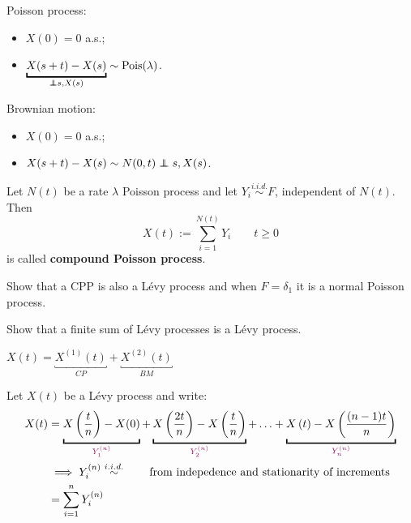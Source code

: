 \documentclass{article}
\begin{document}
	\begin{example}
		Poisson process:
		\begin{itemize}
			\item $X(0)=0$ a.s.;
			\item $\underbracket{X(s+t)-X(s)}_{\mathclap{\independent s,X(s)}}\sim\text{Pois}(\lambda)$.
		\end{itemize}
		Brownian motion:
		\begin{itemize}
		\item $X(0)=0$ a.s.;
		\item $X(s+t)-X(s)\sim N(0,t)\independent s,X(s)$.
		\end{itemize}
	\end{example}
	\begin{definition}
		Let $N(t)$ be a rate $\lambda$ Poisson process and let $Y_i\stackrel{i.i.d.}{\sim}F$, independent of $N(t)$. Then
		\[X(t):=\sum_{i=1}^{N(t)}Y_i\qquad t\geqslant 0\] 
		is called \textbf{compound Poisson process}.
	\end{definition}
	\begin{exercise}
		Show that a CPP is also a L\'evy process and when $F=\delta_1$ it is a normal Poisson process.
	\end{exercise}
	\begin{figure}[H]
		\centering
		
	\end{figure}
	\begin{exercise}
		Show that a finite sum of L\'evy processes is a L\'evy process.
	\end{exercise}
	\begin{example}
		$X(t)=\underbracket{X^{(1)}(t)}_{CP}+\underbracket{X^{(2)}(t)}_{BM}$
		\begin{figure}[H]
			\centering
			
		\end{figure}
		\begin{figure}[H]
			\centering
			
		\end{figure}
	\end{example}
	Let $X(t)$ be a L\'evy process and write:
	\begin{align*}
		X(t)&=\underbracket{X\left(\frac{t}{n}\right)-X(0)}_{\mathclap{\textcolor{RedViolet}{Y_1^{(n)}}}}+\underbracket{X\left(\frac{2t}{n}\right)-X\left(\frac{t}{n} \right) }_{\mathclap{\textcolor{RedViolet}{Y_2^{(n)}}}}+\ldots+\underbracket{X\left(t\right)-X\left(\frac{(n-1)t}{n} \right) }_{\mathclap{\textcolor{RedViolet}{Y_n^{(n)}}}}\\
		&\implies Y_i^{(n)}\stackrel{i.i.d.}{\sim}\qquad\text{from indepedence and stationarity of increments}\\
		&=\sum_{i=1}^{n}Y_i^{(n)}
	\end{align*}
\end{document}
